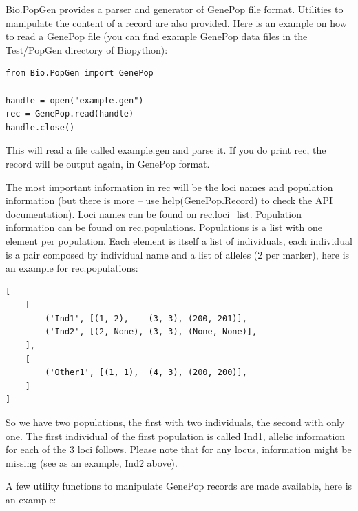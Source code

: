 \documentclass{report}
\begin{document}
Bio.PopGen provides a parser and generator of GenePop file format.
Utilities to manipulate the content of a record are also provided.
Here is an example on how to read a GenePop file (you can find
example GenePop data files in the Test/PopGen directory of Biopython):

\begin{verbatim}
from Bio.PopGen import GenePop

handle = open("example.gen")
rec = GenePop.read(handle)
handle.close()
\end{verbatim}

This will read a file called example.gen and parse it. If you
do print rec, the record will be output again, in GenePop format.

The most important information in rec will be the loci names and
population information (but there is more -- use help(GenePop.Record)
to check the API documentation). Loci names can be found on rec.loci\_list.
Population information can be found on rec.populations.
Populations is a list with one element per population. Each element is itself
a list of individuals, each individual is a pair composed by individual
name and a list of alleles (2 per marker), here is an example for
rec.populations:

\begin{verbatim}
[
    [
        ('Ind1', [(1, 2),    (3, 3), (200, 201)],
        ('Ind2', [(2, None), (3, 3), (None, None)],
    ],
    [
        ('Other1', [(1, 1),  (4, 3), (200, 200)],
    ]
]
\end{verbatim}

So we have two populations, the first with two individuals, the
second with only one. The first individual of the first
population is called Ind1, allelic information for each of
the 3 loci follows. Please note that for any locus, information
might be missing (see as an example, Ind2 above).

A few utility functions to manipulate GenePop records are made
available, here is an example:
\end{document}

